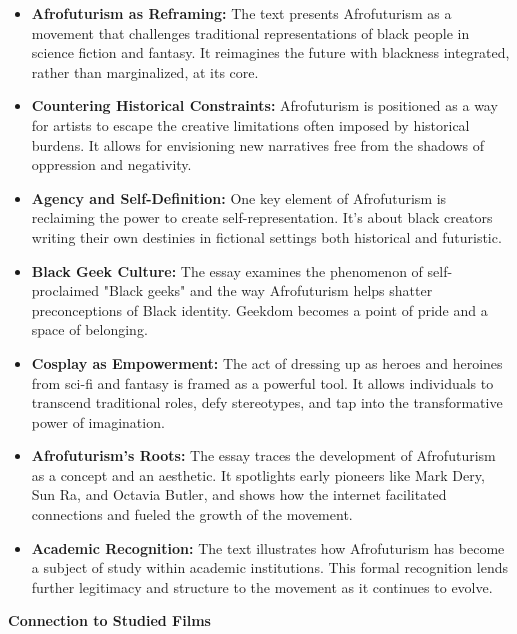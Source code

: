 \documentclass[11pt,fleqn]{book} %
\begin{document}
\begin{itemize}
\item \textbf{Afrofuturism as Reframing:} The text presents Afrofuturism as a movement that challenges traditional representations of black people in science fiction and fantasy. It reimagines the future with blackness integrated, rather than marginalized, at its core.

\item \textbf{Countering Historical Constraints:} Afrofuturism is positioned as a way for artists to escape the creative limitations often imposed by historical burdens. It allows for envisioning new narratives free from the shadows of oppression and negativity.

\item \textbf{Agency and Self-Definition:} One key element of Afrofuturism is reclaiming the power to create self-representation. It's about black creators writing their own destinies in fictional settings both historical and futuristic. 

\item \textbf{Black Geek Culture:} The essay examines the phenomenon of self-proclaimed "Black geeks" and the way Afrofuturism helps shatter preconceptions of Black identity.  Geekdom becomes a point of pride and a space of belonging.

\item \textbf{Cosplay as Empowerment:} The act of dressing up as heroes and heroines from sci-fi and fantasy is framed as a powerful tool. It allows individuals to transcend traditional roles, defy stereotypes, and tap into the transformative power of imagination.

\item \textbf{Afrofuturism's Roots:} The essay traces the development of Afrofuturism as a concept and an aesthetic. It spotlights early pioneers like Mark Dery, Sun Ra, and Octavia Butler, and shows how the internet facilitated connections and fueled the growth of the movement.

\item \textbf{Academic Recognition:}  The text illustrates how Afrofuturism has become a subject of study within academic institutions. This formal recognition lends further legitimacy and structure to the movement as it continues to evolve. 
\end{itemize}
\vspace{5pt}
\textbf{Connection to Studied Films}
\end{document}
